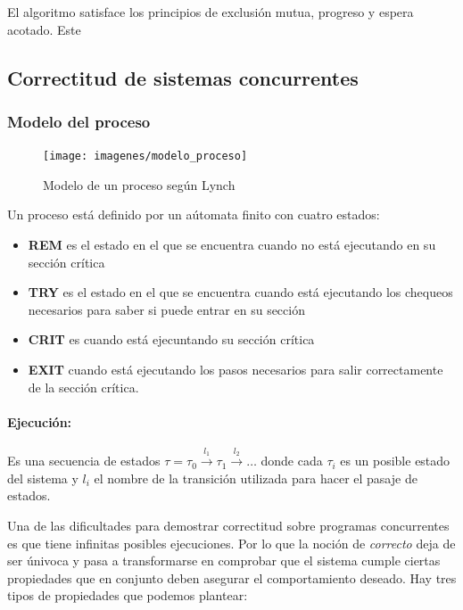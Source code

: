 El algoritmo satisface los principios de exclusión mutua, progreso y espera acotado. Este 
\subsection{Correctitud de sistemas concurrentes}
\subsubsection{Modelo del proceso}

\begin{figure}[H]
    \centering
    \texttt{[image: imagenes/modelo\_proceso]}
    \caption{Modelo de un proceso según Lynch}
    \label{fig:modeloproceso}
\end{figure}

Un proceso está definido por un aútomata finito con cuatro estados:
\begin{itemize}
    \item \textbf{REM} es el estado en el que se encuentra cuando no está ejecutando en su sección crítica
    \item \textbf{TRY} es el estado en el que se encuentra  cuando está ejecutando los chequeos necesarios para saber si puede entrar en su sección
    \item \textbf{CRIT} es cuando está ejecuntando su sección crítica
    \item \textbf{EXIT} cuando está ejecutando los pasos necesarios para salir correctamente de la sección crítica.
\end{itemize}

\paragraph{Ejecución:} Es una secuencia de estados $\tau = \tau_0 \overset{l_1}{\rightarrow} \tau_1 \overset{l_2}{\rightarrow}\dots$ donde cada $\tau_i$ es un posible estado del sistema y $l_i$ el nombre de la transición utilizada para hacer el pasaje de estados.

\vspace*{.5cm}
Una de las dificultades para demostrar correctitud sobre 
programas concurrentes es que tiene infinitas posibles ejecuciones. Por lo que la noción de \textit{correcto} deja de ser únivoca y pasa a transformarse en comprobar que el sistema cumple ciertas propiedades que en conjunto deben asegurar el comportamiento deseado. Hay tres tipos de propiedades que podemos plantear: 

